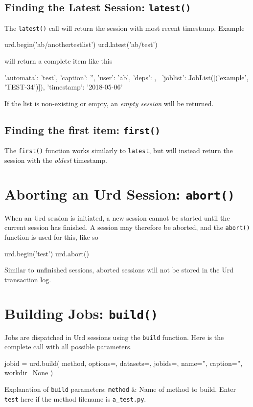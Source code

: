 \subsection{Finding the Latest Session:  \texttt{latest()}}
The \texttt{latest()} call will return the session with most recent
timestamp.  Example
\begin{python}
urd.begin('ab/anothertestlist')
urd.latest('ab/test')
\end{python}
will return a complete item like this
\begin{shell}
{'automata': 'test', 'caption': '', 'user': 'ab', 'deps': {}, \
 'joblist': JobList([('example', 'TEST-34')]), 'timestamp': '2018-05-06'}
\end{shell}
If the list is non-existing or empty, an \textsl{empty session} will be returned.



\subsection{Finding the first item:  \texttt{first()}}
The \texttt{first()} function works similarly to \texttt{latest}, but
will instead return the session with the \textsl{oldest} timestamp.





\section{Aborting an Urd Session:  \texttt{abort()}}

When an Urd session is initiated, a new session cannot be started
until the current session has finished.  A session may therefore be
aborted, and the \texttt{abort()} function is used for this, like so
\begin{python}
urd.begin('test')
urd.abort()
\end{python}
Similar to unfinished sessions, aborted sessions will not be stored in
the Urd transaction log.




\section{Building Jobs: \texttt{build()}}
\label{sec:urd_build}

Jobs are dispatched in Urd sessions using the \texttt{build} function.
Here is the complete call with all possible parameters.
\begin{python}
jobid = urd.build(
    method,
    options={},    datasets={},    jobids={},
    name='',       caption='',
    workdir=None
)
\end{python}
Explanation of \texttt{build} parameters:
\starttabletwo
\RPtwo \texttt{method} & Name of method to build.  Enter \texttt{test}
    here if the method filename is \texttt{a\_test.py}.\\[2ex]
    
